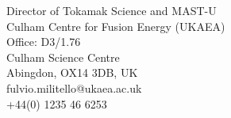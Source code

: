 \documentclass[12pt,a4paper,sans]{moderncv}        %
\begin{document}
\begin{cvcolumns}






 {Director of Tokamak Science and MAST-U \\
Culham Centre for Fusion Energy (UKAEA) \\
Office: D3/1.76	  \\
Culham Science Centre \\
Abingdon, OX14 3DB, UK \\
\emailsymbol fulvio.militello@ukaea.ac.uk \\
\fixedphonesymbol +44(0) 1235 46 6253}

\end{cvcolumns}
\end{document}
